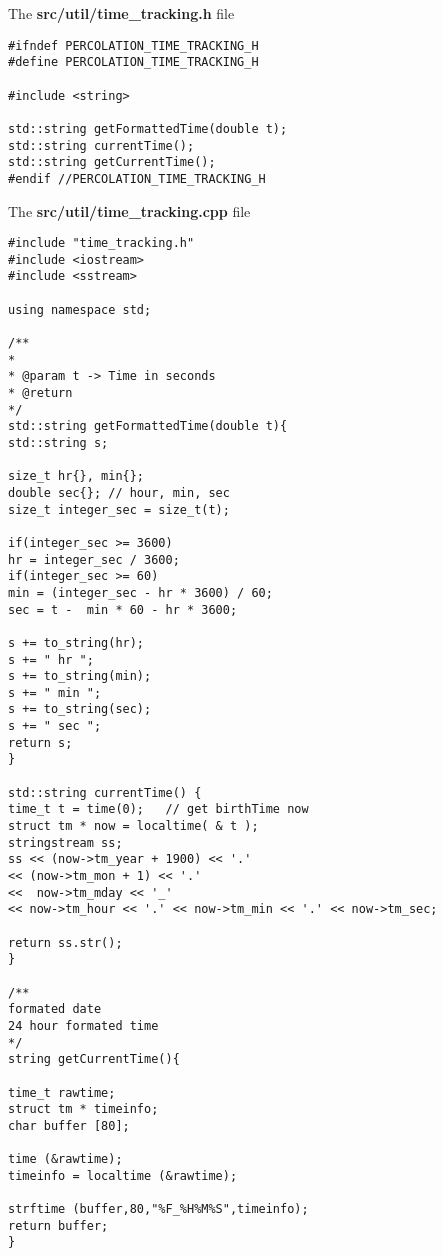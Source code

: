
The \textbf{src/util/time\_tracking.h} file

\begin{lstlisting}[style=CStyle]
#ifndef PERCOLATION_TIME_TRACKING_H
#define PERCOLATION_TIME_TRACKING_H

#include <string>

std::string getFormattedTime(double t);
std::string currentTime();
std::string getCurrentTime();
#endif //PERCOLATION_TIME_TRACKING_H
\end{lstlisting}

The \textbf{src/util/time\_tracking.cpp} file

\begin{lstlisting}[style=CStyle]
#include "time_tracking.h"
#include <iostream>
#include <sstream>

using namespace std;

/**
*
* @param t -> Time in seconds
* @return
*/
std::string getFormattedTime(double t){
std::string s;

size_t hr{}, min{};
double sec{}; // hour, min, sec
size_t integer_sec = size_t(t);

if(integer_sec >= 3600)
hr = integer_sec / 3600;
if(integer_sec >= 60)
min = (integer_sec - hr * 3600) / 60;
sec = t -  min * 60 - hr * 3600;

s += to_string(hr);
s += " hr ";
s += to_string(min);
s += " min ";
s += to_string(sec);
s += " sec ";
return s;
}

std::string currentTime() {
time_t t = time(0);   // get birthTime now
struct tm * now = localtime( & t );
stringstream ss;
ss << (now->tm_year + 1900) << '.'
<< (now->tm_mon + 1) << '.'
<<  now->tm_mday << '_'
<< now->tm_hour << '.' << now->tm_min << '.' << now->tm_sec;

return ss.str();
}

/**
formated date
24 hour formated time
*/
string getCurrentTime(){

time_t rawtime;
struct tm * timeinfo;
char buffer [80];

time (&rawtime);
timeinfo = localtime (&rawtime);

strftime (buffer,80,"%F_%H%M%S",timeinfo);
return buffer;
}
\end{lstlisting}